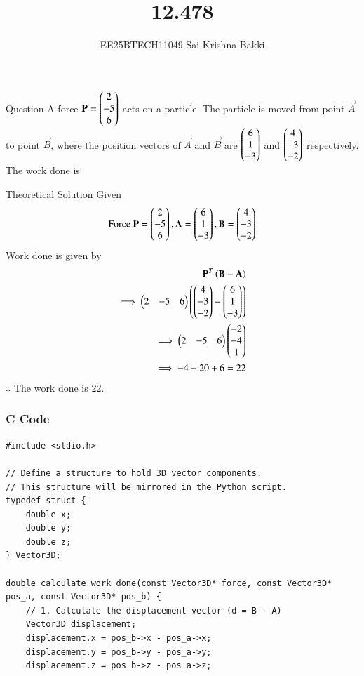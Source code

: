 \documentclass{beamer}
\title %
{12.478}
\author 
{EE25BTECH11049-Sai Krishna Bakki}
\begin{document}
\frame{\titlepage}
\begin{frame}{Question}
A force $\mathbf{P}=\begin{pmatrix}2\\-5\\6\end{pmatrix}$ acts on a particle. The particle is moved from point $\vec{A}$ to point $\vec{B}$, where the position vectors of $\vec{A}$ and $\vec{B}$ are $\begin{pmatrix}6\\1\\-3\end{pmatrix}$ and $\begin{pmatrix}4\\-3\\-2\end{pmatrix}$ respectively. The work done is
\end{frame}
\begin{frame}{Theoretical Solution}
    Given
\begin{align}
    \text{Force } \mathbf{P}=\begin{pmatrix}2\\-5\\6\end{pmatrix},\mathbf{A}=\begin{pmatrix}6\\1\\-3\end{pmatrix},\mathbf{B}=\begin{pmatrix}4\\-3\\-2\end{pmatrix}
\end{align}
Work done is given by
\begin{align}
    \mathbf{P}^T\left(\mathbf{B}-\mathbf{A}\right)\\
    \implies \begin{pmatrix}2&-5&6\end{pmatrix}\left(\begin{pmatrix}4\\-3\\-2\end{pmatrix}-\begin{pmatrix}6\\1\\-3\end{pmatrix}\right)\\
    \implies \begin{pmatrix}2&-5&6\end{pmatrix}\begin{pmatrix}-2\\-4\\1\end{pmatrix}\\
    \implies -4+20+6=22
\end{align}
$\therefore$ The work done is 22.
\end{frame}
\begin{frame}[fragile]
\frametitle{C Code}
\begin{lstlisting}
#include <stdio.h>

// Define a structure to hold 3D vector components.
// This structure will be mirrored in the Python script.
typedef struct {
    double x;
    double y;
    double z;
} Vector3D;

double calculate_work_done(const Vector3D* force, const Vector3D* pos_a, const Vector3D* pos_b) {
    // 1. Calculate the displacement vector (d = B - A)
    Vector3D displacement;
    displacement.x = pos_b->x - pos_a->x;
    displacement.y = pos_b->y - pos_a->y;
    displacement.z = pos_b->z - pos_a->z;
\end{lstlisting}
\end{frame}
\end{document}
